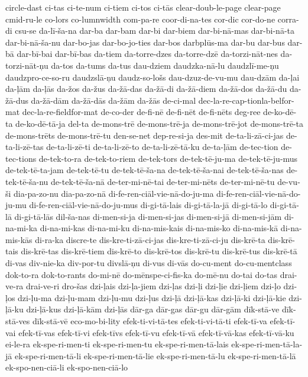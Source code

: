 {circle-dast
ci-tas
ci-te-num
ci-tiem
ci-tos
ci-tās
clear-doub-le-page
clear-page
cmid-ru-le
co-lors
co-lumnwidth
com-pa-re
coor-di-na-tes
cor-dic
cor-do-ne
corra-di
csu-se
da-lī-ša-na
dar-ba
dar-bam
dar-bi
dar-biem
dar-bi-nā-mas
dar-bi-nā-ta
dar-bi-nā-ša-nu
dar-bo-jas
dar-bo-jo-ties
dar-bos
darbplūs-ma
dar-bu
dar-bus
dar-bā
dar-bī-bai
dar-bī-bas
da-tiem
da-torre-dzes
da-torre-dzē
da-torzi-nāt-nes
da-torzi-nāt-ņu
da-tos
da-tums
da-tus
dau-dziem
daudzka-nā-lu
daudzlī-me-ņu
daudzpro-ce-so-ru
daudzslā-ņu
daudz-so-lošs
dau-dzuz-de-vu-mu
dau-dzām
da-ļai
da-ļām
da-ļās
da-žos
da-žus
da-žā-das
da-žā-di
da-žā-diem
da-žā-dos
da-žā-du
da-žā-dus
da-žā-dām
da-žā-dās
da-žām
da-žās
de-ci-mal
dec-la-re-cap-tionla-belfor-mat
dec-la-re-fieldfor-mat
de-co-der
de-fi-nē
de-fi-nēt
de-fi-nēts
deg-ree
de-ko-dē-ta
de-ko-dē-tā-ja
del-ta
de-mons-trē
de-mons-trē-ja
de-mons-trē-jot
de-mons-trē-ta
de-mons-trēts
de-mons-trē-tu
den-se-net
dep-re-si-ja
des-mit
de-ta-li-zā-ci-jas
de-ta-li-zē-tas
de-ta-li-zē-ti
de-ta-li-zē-to
de-ta-li-zē-tā-ku
de-ta-ļām
de-tec-tion
de-tec-tions
de-tek-to-ra
de-tek-to-riem
de-tek-tors
de-tek-tē-ju-ma
de-tek-tē-ju-mus
de-tek-tē-ta-jam
de-tek-tē-tu
de-tek-tē-ša-na
de-tek-tē-ša-nai
de-tek-tē-ša-nas
de-tek-tē-ša-nu
de-tek-tē-ša-nā
de-ter-mi-nē-tai
de-ter-mi-nēts
de-ter-mi-nē-tu
de-vu-ši
dia-pa-zo-nu
dia-pa-zo-nā
di-fe-ren-ciāl-vie-nā-do-ju-ma
di-fe-ren-ciāl-vie-nā-do-ju-mu
di-fe-ren-ciāl-vie-nā-do-ju-mus
di-gi-tā-lais
di-gi-tā-la-jā
di-gi-tā-lo
di-gi-tā-lā
di-gi-tā-lās
dil-ša-nas
di-men-si-ja
di-men-si-jas
di-men-si-jā
di-men-si-jām
di-na-mi-ka
di-na-mi-kas
di-na-mi-ku
di-na-mis-kais
di-na-mis-ko
di-na-mis-kā
di-na-mis-kās
di-ra-ka
discre-te
dis-kre-ti-zā-ci-jas
dis-kre-ti-zā-ci-ju
dis-krē-ta
dis-krē-tais
dis-krē-tas
dis-krē-tiem
dis-krē-to
dis-krē-tos
dis-krē-tu
dis-krē-tus
dis-krē-tā
di-vas
div-nie-ka
div-por-tu
divslā-ņu
di-vus
di-vās
do-cu-ment
do-cu-mentclass
dok-to-ra
dok-to-rants
do-mi-nē
do-mēnspe-ci-fis-ka
do-mē-nu
do-tai
do-tas
drai-ve-ra
drai-ve-ri
dro-šas
dzi-ļais
dzi-ļa-jiem
dzi-ļas
dzi-ļi
dzi-ļie
dzi-ļiem
dzi-ļo
dzi-ļos
dzi-ļu-ma
dzi-ļu-mam
dzi-ļu-mu
dzi-ļus
dzi-ļā
dzi-ļā-kas
dzi-ļā-ki
dzi-ļā-kie
dzi-ļā-ku
dzi-ļā-kus
dzi-ļā-kām
dzi-ļās
dār-ga
dār-gas
dār-gu
dār-gām
dīk-stā-ve
dīk-stā-ves
dīk-stā-vē
eco-mo-bi-lity
efek-ti-vi-tā-tes
efek-ti-vi-tā-ti
efek-tī-va
efek-tī-vai
efek-tī-vas
efek-tī-vi
efek-tīvs
efek-tī-vu
efek-tī-vā
efek-tī-vā-kas
efek-tī-vā-ku
ei-le-ra
ek-spe-ri-men-ti
ek-spe-ri-men-tu
ek-spe-ri-men-tā-lais
ek-spe-ri-men-tā-la-jā
ek-spe-ri-men-tā-li
ek-spe-ri-men-tā-lie
ek-spe-ri-men-tā-lu
ek-spe-ri-men-tā-lā
ek-spo-nen-ciā-li
ek-spo-nen-ciā-lo
}
